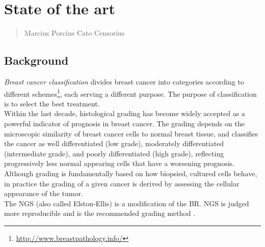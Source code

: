 \chapter{State of the art}
\label{chapter2}
\thispagestyle{empty}

\begin{quotation}
{\footnotesize
{}
\begin{flushright}
Marcius Porcius Cato Censorius
\end{flushright}
}
\end{quotation}
\vspace{0.5cm}


\section{Background}

\indent \textit{Breast cancer classification} divides breast cancer into categories according to different schemes\footnote{\url{http://www.breastpathology.info/}}, each serving a different purpose.
The purpose of classification is to select the best treatment\cite{Genestie2011}.\\
Within the last decade, histological grading has become widely accepted as a powerful indicator of prognosis in breast cancer. 
The grading depends on the microscopic similarity of breast cancer cells to normal breast tissue, and classifies the cancer as well differentiated (low grade),
moderately differentiated (intermediate grade), and poorly differentiated (high grade), reflecting progressively less normal appearing cells that have a worsening prognosis.
Although grading is fundamentally based on how biopsied, cultured cells behave, in practice the grading of a given cancer is derived by assessing the cellular appearance of the tumor.\\
The \Gls{NGS} (also called Elston-Ellis) is a modification \cite{breastCancerGrading01} of the \Gls{BR}\cite{BRgrading01, BRgenestie}. \Gls{NGS}
is judged more reproducible and is the recommended grading method \cite{NGSrecommended}.


